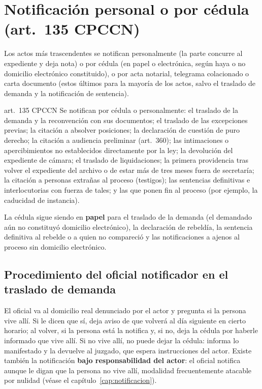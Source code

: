 \documentclass[12pt,oneside]{book}
\begin{document}
\section{Notificación personal o por cédula (art.~135 CPCCN)}

Los actos más trascendentes se notifican personalmente (la parte concurre al expediente y deja nota) o por cédula (en papel o electrónica, según haya o no domicilio electrónico constituido), o por acta notarial, telegrama colacionado o carta documento (estos últimos para la mayoría de los actos, salvo el traslado de demanda y la notificación de sentencia).

\begin{norma}{art.~135 CPCCN}
Se notifican por cédula o personalmente: el traslado de la demanda y la reconvención con sus documentos; el traslado de las excepciones previas; la citación a absolver posiciones; la declaración de cuestión de puro derecho; la citación a audiencia preliminar (art.~360); las intimaciones o apercibimientos no establecidos directamente por la ley; la devolución del expediente de cámara; el traslado de liquidaciones; la primera providencia tras volver el expediente del archivo o de estar más de tres meses fuera de secretaría; la citación a personas extrañas al proceso (testigos); las sentencias definitivas e interlocutorias con fuerza de tales; y las que ponen fin al proceso (por ejemplo, la caducidad de instancia).
\end{norma}

La cédula sigue siendo en \textbf{papel} para el traslado de la demanda (el demandado aún no constituyó domicilio electrónico), la declaración de rebeldía, la sentencia definitiva al rebelde o a quien no compareció y las notificaciones a ajenos al proceso sin domicilio electrónico.

\subsection{Procedimiento del oficial notificador en el traslado de demanda}

El oficial va al domicilio real denunciado por el actor y pregunta si la persona vive allí. Si le dicen que sí, deja aviso de que volverá al día siguiente en cierto horario; al volver, si la persona está la notifica y, si no, deja la cédula por haberle informado que vive allí. Si no vive allí, no puede dejar la cédula: informa lo manifestado y la devuelve al juzgado, que espera instrucciones del actor. Existe también la notificación \textbf{bajo responsabilidad del actor}: el oficial notifica aunque le digan que la persona no vive allí, modalidad frecuentemente atacable por nulidad (véase el capítulo~\ref{cap:notificacion}).
\end{document}
